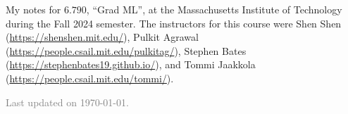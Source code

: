 \documentclass[11pt]{article}
\begin{document}
\maketitle

My notes for $6.790$, ``Grad ML'', at the Massachusetts Institute of Technology during the Fall 2024 semester. The instructors for this course were Shen Shen (\url{https://shenshen.mit.edu/}), Pulkit Agrawal (\url{https://people.csail.mit.edu/pulkitag/}), Stephen Bates (\url{https://stephenbates19.github.io/}), and Tommi Jaakkola (\url{https://people.csail.mit.edu/tommi/}). 

\vfill

\hfill \textcolor{gray}{\small Last updated on \today.}
\newpage
\tableofcontents 
\newpage
\importfiles %
\end{document}
